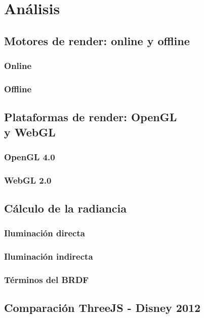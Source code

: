 \chapter{An\'alisis}

\section{Motores de render: online y offline}
    \subsection{Online}
    \subsection{Offline}

\section[Plataformas de render: OpenGL y WebGL]{Plataformas de render: OpenGL \\y WebGL}
    \subsection{OpenGL 4.0}
    \subsection{WebGL 2.0}

\section{C\'alculo de la radiancia}
    \subsection{Iluminaci\'on directa}
    \subsection{Iluminaci\'on indirecta}
    \subsection{T\'erminos del BRDF}

\section{Comparaci\'on ThreeJS - Disney 2012}

